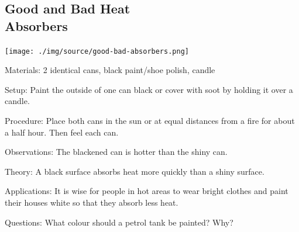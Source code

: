 \begin{multicols}{2}
\subsection[Good and Bad Heat Absorbers]{Good and Bad Heat \hfill \\ Absorbers}

\begin{center}
\texttt{[image: ./img/source/good-bad-absorbers.png]}
\end{center}

\begin{description*}
\item[Materials:]{2 identical cans, black paint/shoe polish, candle}
\item[Setup:]{Paint the outside of one can black or cover with soot by holding it over a candle.}
\item[Procedure:]{Place both cans in the sun or at equal distances from a fire for about a half hour. Then feel each can.}
\item[Observations:]{The blackened can is hotter than the shiny can.}
\item[Theory:]{A black surface absorbs heat more quickly than a shiny surface.}
\item[Applications:]{It is wise for people in hot areas to wear bright clothes and paint their houses white so that they absorb less heat.}
\item[Questions:]{What colour should a petrol tank be painted? Why?}
\end{description*}



\end{multicols}

\pagebreak